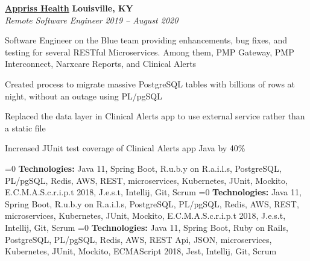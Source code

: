 %
    \headerrow
        {\textbf{\href{https://apprisshealth.com/}{Appriss Health}}}
        {\textbf{Louisville, KY}}
    \\
    \headerrow
        {\emph{Remote Software Engineer}}
        {\emph{2019 -- August 2020}}
    \begin{itemize*}
        \item Software Engineer on the Blue team providing enhancements, bug fixes, and testing for several RESTful Microservices.
            Among them, PMP Gateway, PMP Interconnect, Narxcare Reports, and Clinical Alerts
        \item Created process to migrate massive PostgreSQL tables with billions of rows at night, without an outage using PL/pgSQL
        \item Replaced the data layer in Clinical Alerts app to use external service rather than a static file
        \item Increased JUnit test coverage of Clinical Alerts app Java by 40\%
    \end{itemize*}

    \ifnum{}=0
    \hspace{1.0em}
        {\textbf{Technologies:} Java 11, Spring Boot, R.u.b.y on R.a.i.l.s, PostgreSQL, PL/pgSQL, Redis, AWS,
        REST, microservices, Kubernetes, JUnit, Mockito, E.C.M.A.S.c.r.i.p.t 2018, J.e.s.t, Intellij, Git, Scrum}
    \fi
    \ifnum{}=0
    \hspace{1.0em}
        {\textbf{Technologies:} Java 11, Spring Boot, R.u.b.y on R.a.i.l.s, PostgreSQL, PL/pgSQL, Redis, AWS,
        REST, microservices, Kubernetes, JUnit, Mockito, E.C.M.A.S.c.r.i.p.t 2018, J.e.s.t, Intellij, Git, Scrum}
    \fi
    \ifnum{}=0
    \hspace{1.0em}
        {\textbf{Technologies:} Java 11, Spring Boot, Ruby on Rails, PostgreSQL, PL/pgSQL, Redis, AWS,
        REST Api, JSON, microservices, Kubernetes, JUnit, Mockito, ECMAScript 2018, Jest, Intellij, Git, Scrum}
    \fi



